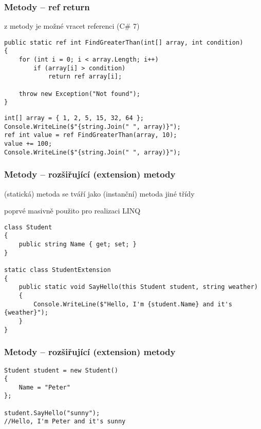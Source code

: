 \begin{frame}[fragile]
\frametitle{Metody -- ref return}

\begin{bitemize}{}
\item z metody je možné vracet referenci (C\# 7)
\end{bitemize}

\begin{yesblock}
\begin{lstlisting}[basicstyle=\small]
public static ref int FindGreaterThan(int[] array, int condition)
{
    for (int i = 0; i < array.Length; i++)
        if (array[i] > condition)
            return ref array[i];

    throw new Exception("Not found");
}
\end{lstlisting}
\end{yesblock}

\begin{yesblock}
\begin{lstlisting}[basicstyle=\small]
int[] array = { 1, 2, 5, 15, 32, 64 };
Console.WriteLine($"{string.Join(" ", array)}");
ref int value = ref FindGreaterThan(array, 10);
value += 100;
Console.WriteLine($"{string.Join(" ", array)}");
\end{lstlisting}
\end{yesblock}
\end{frame}





\begin{frame}[fragile]
\frametitle{Metody -- rozšiřující (extension) metody}

\begin{bitemize}{}
\item (statická) metoda se tváří jako (instanční) metoda jiné třídy
\item poprvé masivně použito pro realizaci LINQ
\end{bitemize}

\begin{yesblock}
\begin{lstlisting}[basicstyle=\small]
class Student
{
    public string Name { get; set; }
}

static class StudentExtension
{
    public static void SayHello(this Student student, string weather)
    {
        Console.WriteLine($"Hello, I'm {student.Name} and it's {weather}");
    }
}
\end{lstlisting}
\end{yesblock}
\end{frame}

\begin{frame}[fragile]
\frametitle{Metody -- rozšiřující (extension) metody}
\begin{yesblock}
\begin{lstlisting}[basicstyle=\small]
Student student = new Student()
{
    Name = "Peter"
};

student.SayHello("sunny");
//Hello, I'm Peter and it's sunny
\end{lstlisting}
\end{yesblock}
\end{frame}


\zkouskove